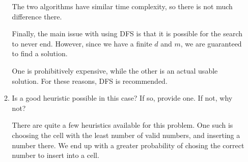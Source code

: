 \documentclass[12pt,letterpaper]{article}
\begin{document}
\begin{enumerate}
\begin{enumerate}
          The two algorithms have similar time complexity, so there is not much difference there.

          Finally, the main issue with using DFS is that it is possible for the search to never end.
          However, since we have a finite $d$ and $m$, we are guaranteed to find a solution.

          One is prohibitively expensive, while the other is an actual usable solution.
          For these reasons, DFS is recommended.
        \item
          Is a good heuristic possible in this case?
          If so, provide one. If not, why not?

          There are quite a few heuristics available for this problem.
          One such is choosing the cell with the least number of valid numbers,
          and inserting a number there.
          We end up with a greater probability of chosing the correct number to insert into a cell.
      \end{enumerate}

  \end{enumerate}
\end{document}
